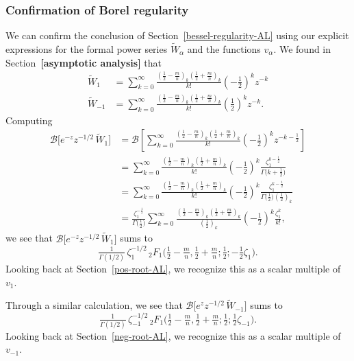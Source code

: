 \documentclass{article}
\theoremstyle{definition}
\newcommand{\borel}{\mathcal{B}}
\begin{document}
\subsubsection{Confirmation of Borel regularity}
We can confirm the conclusion of Section~\ref{bessel-regularity-AL} using our explicit expressions for the formal power series $\tilde{W}_\alpha$ and the functions $v_\alpha$. We found in Section~\textbf{[asymptotic analysis]} that
\begin{align*}
\tilde{W}_1 & = \sum_{k = 0}^{\infty} \frac{\left(\tfrac{1}{2}-\tfrac{m}{n}\right)_k \left(\tfrac{1}{2}+\tfrac{m}{n}\right)_k}{k!} \left(-\frac{1}{2}\right)^k z^{-k} \\
\tilde{W}_{-1} & = \sum_{k = 0}^{\infty} \frac{\left(\tfrac{1}{2}-\tfrac{m}{n}\right)_k \left(\tfrac{1}{2}+\tfrac{m}{n}\right)_k}{k!} \left(\frac{1}{2}\right)^k z^{-k}.
\end{align*}
Computing
\begin{align*}
\borel\big[ e^{-z} z^{-1/2}\,\tilde{W}_1 \big] & = \borel\left[ \sum_{k = 0}^{\infty} \frac{\left(\tfrac{1}{2}-\tfrac{m}{n}\right)_k \left(\tfrac{1}{2}+\tfrac{m}{n}\right)_k}{k!} \left(-\frac{1}{2}\right)^k z^{-k-\frac{1}{2}} \right] \\
& = \sum_{k = 0}^{\infty} \frac{\left(\tfrac{1}{2}-\tfrac{m}{n}\right)_k \left(\tfrac{1}{2}+\tfrac{m}{n}\right)_k}{k!} \left(-\frac{1}{2}\right)^k \frac{\zeta_1^{k-\frac{1}{2}}}{\Gamma\big(k+\frac{1}{2}\big)} \\
& = \sum_{k = 0}^{\infty} \frac{\left(\tfrac{1}{2}-\tfrac{m}{n}\right)_k \left(\tfrac{1}{2}+\tfrac{m}{n}\right)_k}{k!} \left(-\frac{1}{2}\right)^k \frac{\zeta_1^{k-\frac{1}{2}}}{\Gamma\big(\frac{1}{2}\big) \left(\frac{1}{2}\right)_k} \\
& = \frac{\zeta_1^{-\frac{1}{2}}}{\Gamma\big(\frac{1}{2}\big)} \sum_{k = 0}^{\infty} \frac{\left(\tfrac{1}{2}-\tfrac{m}{n}\right)_k \left(\tfrac{1}{2}+\tfrac{m}{n}\right)_k}{\left(\frac{1}{2}\right)_k} \left(-\frac{1}{2}\right)^k \frac{\zeta_1^k}{k!},
\end{align*}
we see that $\borel\big[ e^{-z} z^{-1/2}\,\tilde{W}_1 \big]$ sums to
\[ \tfrac{1}{\Gamma(1/2)}\,\zeta_1^{-1/2}\,{}_2F_1\big(\tfrac{1}{2}-\tfrac{m}{n}, \tfrac{1}{2}+\tfrac{m}{n}; \tfrac{1}{2}; -\tfrac{1}{2}\zeta_1\big). \]
Looking back at Section~\ref{pos-root-AL}, we recognize this as a scalar multiple of $v_1$.

Through a similar calculation, we see that $\borel\big[ e^z z^{-1/2}\,\tilde{W}_{-1} \big]$ sums to
\[ \tfrac{1}{\Gamma(1/2)}\,\zeta_{-1}^{-1/2}\,{}_2F_1\big(\tfrac{1}{2}-\tfrac{m}{n}, \tfrac{1}{2}+\tfrac{m}{n}; \tfrac{1}{2}; \tfrac{1}{2}\zeta_{-1}\big). \]
Looking back at Section~\ref{neg-root-AL}, we recognize this as a scalar multiple of $v_{-1}$.
\end{document}
